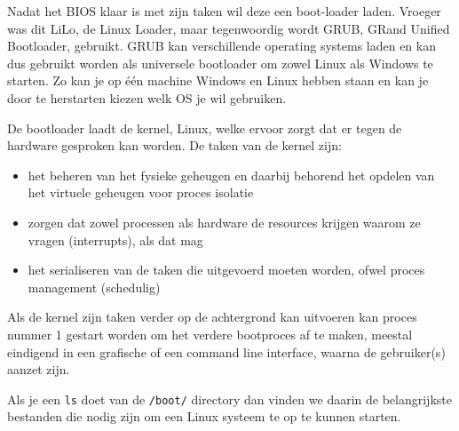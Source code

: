 Nadat het BIOS klaar is met zijn taken wil deze een boot-loader laden. Vroeger was dit LiLo, de Linux Loader, maar tegenwoordig wordt GRUB, GRand Unified Bootloader, gebruikt. GRUB kan verschillende operating systems laden en kan dus gebruikt worden als universele bootloader om zowel Linux als Windows te starten. Zo kan je op \'e\'en machine Windows en Linux hebben staan en kan je door te herstarten kiezen welk OS je wil gebruiken.

De bootloader laadt de kernel, Linux, welke ervoor zorgt dat er tegen de hardware gesproken kan worden. De taken van de kernel zijn:
\begin{itemize}
\item het beheren van het fysieke geheugen en daarbij behorend het opdelen van het virtuele geheugen voor proces isolatie
\item zorgen dat zowel processen als hardware de resources krijgen waarom ze vragen (interrupts), als dat mag
\item het serialiseren van de taken die uitgevoerd moeten worden, ofwel proces management (schedulig)
\end{itemize}

Als de kernel zijn taken verder op de achtergrond kan uitvoeren kan proces nummer 1 gestart worden om het verdere bootproces af te maken, meestal eindigend in een grafische of een command line interface, waarna de gebruiker(s) aanzet zijn.

Als je een \texttt{ls} doet van de \texttt{/boot/} directory dan vinden we daarin de belangrijkste bestanden die nodig zijn om een Linux systeem te op te kunnen starten.

